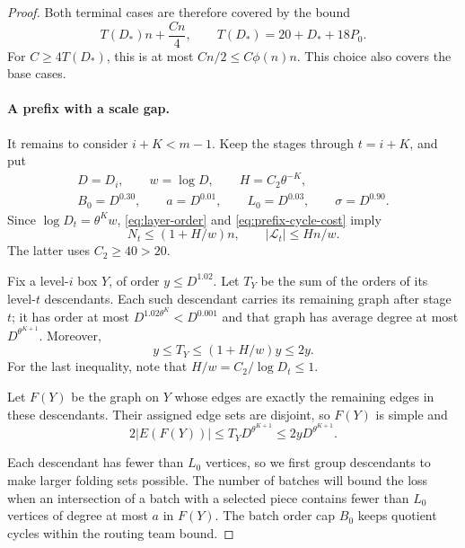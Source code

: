 \begin{proof}
Both terminal cases are therefore covered by the bound
\[
 T(D_*)n+\frac{Cn}{4},\qquad
 T(D_*)=20+D_*+18P_0.
\]
For \(C\ge4T(D_*)\), this is at most
\(Cn/2\le C\phi(n)n\). This choice also covers the base cases.

\paragraph{A prefix with a scale gap.}
It remains to consider \(i+K<m-1\). Keep the stages through
\(t=i+K\), and put
\begin{equation}\label{eq:batch-parameters}
 \begin{gathered}
 D=D_i,\qquad w=\log D,\qquad H=C_2\theta^{-K},\\
 B_0=D^{0.30},\qquad a=D^{0.01},\qquad
 L_0=D^{0.03},\qquad \sigma=D^{0.90}.
 \end{gathered}
\end{equation}
Since \(\log D_t=\theta^K w\),
\eqref{eq:layer-order} and \eqref{eq:prefix-cycle-cost} imply
\begin{equation}\label{eq:gap-global-bounds}
 N_t\le(1+H/w)n,\qquad |\mathcal L_t|\le Hn/w.
\end{equation}
The latter uses \(C_2\ge40>20\).

Fix a level-\(i\) box \(Y\), of order \(y\le D^{1.02}\).
Let \(T_Y\) be the sum of the orders of its level-\(t\)
descendants. Each such descendant carries its remaining graph
after stage \(t\); it has order at most
\(D^{1.02\theta^K}<D^{0.001}\) and that graph has average
degree at most \(D^{\theta^{K+1}}\). Moreover,
\begin{equation}\label{eq:descendant-order}
 y\le T_Y\le(1+H/w)y\le2y.
\end{equation}
For the last inequality, note that
\(H/w=C_2/\log D_t\le1\).

Let \(F(Y)\) be the graph on \(Y\) whose edges are exactly
the remaining edges in these descendants. Their assigned edge
sets are disjoint, so \(F(Y)\) is simple and
\begin{equation}\label{eq:descendant-degree}
 2|E(F(Y))|\le T_YD^{\theta^{K+1}}
 \le2yD^{\theta^{K+1}}.
\end{equation}

Each descendant has fewer than \(L_0\) vertices, so we first group
descendants to make larger folding sets possible. The number of
batches will bound the loss when an intersection of a batch with a
selected piece contains fewer than \(L_0\) vertices of degree at
most \(a\) in \(F(Y)\). The batch order cap \(B_0\) keeps quotient
cycles within the routing team bound.


\end{proof}
